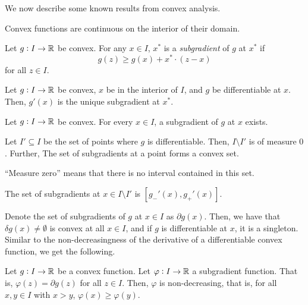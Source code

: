 		We now describe some known results from convex analysis.

		\begin{fact}
			Convex functions are continuous on the interior of their domain.
		\end{fact}

		\begin{definition}
			Let $g : I \to \mathbb{R}$ be convex. For any $x \in I$, $x^*$ is a \emph{subgradient} of $g$ at $x^*$ if
			\[ g(z) \ge g(x) + x^*\cdot(z-x) \]
			for all $z \in I$.
		\end{definition}


		\begin{lemma}
			Let $g : I \to \mathbb{R}$ be convex, $x$ be in the interior of $I$, and $g$ be differentiable at $x$. Then, $g'(x)$ is the unique subgradient at $x^*$.
		\end{lemma}

		\begin{lemma}
			Let $g : I \to \mathbb{R}$ be convex. For every $x \in I$, a subgradient of $g$ at $x$ exists.
		\end{lemma}

		\begin{fact}
			Let $I' \subseteq I$ be the set of points where $g$ is differentiable. Then, $I \setminus I'$ is of measure $0$. Further, The set of subgradients at a point forms a convex set.
		\end{fact}
		``Measure zero'' means that there is no interval contained in this set.

		\begin{fact}
			The set of subgradients at $x \in I \setminus I'$ is $[g_-'(x),g_+'(x)]$.
		\end{fact}

		Denote the set of subgradients of $g$ at $x \in I$ as $\partial g(x)$. Then, we have that $\delta g(x) \ne \emptyset$ is convex at all $x \in I$, and if $g$ is differentiable at $x$, it is a singleton.\\
		Similar to the non-decreasingness of the derivative of a differentiable convex function, we get the following.

		\begin{lemma}
			\label{lem: subgrad nondec}
			Let $g : I \to \mathbb{R}$ be a convex function. Let $\varphi : I \to \mathbb{R}$ a subgradient function. That is, $\varphi(z) = \partial g(z)$ for all $z \in I$. Then, $\varphi$ is non-decreasing, that is, for all $x,y \in I$ with $x > y$, $\varphi(x) \ge \varphi(y)$.
		\end{lemma}

